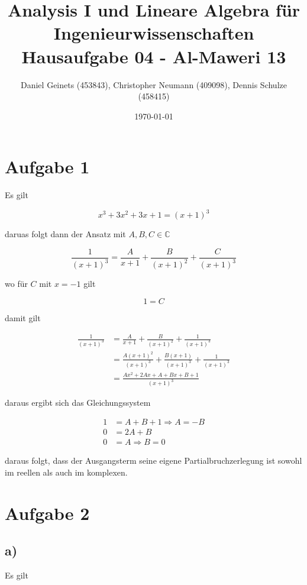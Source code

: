 \documentclass[a4paper, 11pt]{article}
\author{Daniel Geinets (453843), Christopher Neumann (409098), Dennis Schulze (458415)}
\date{\today}
\title{Analysis I und Lineare Algebra für Ingenieurwissenschaften \large  \\ Hausaufgabe 04 - Al-Maweri 13}
\begin{document}
\maketitle
\tableofcontents

\setcounter{secnumdepth}{0}
\newcommand{\tuple}[1]{\left(#1\right)}
\renewcommand{\cfrac}[3]{#1 \tuple{\frac{#2}{#3}}}
\newcommand{\R}{\mathbb{R}}
\newcommand{\Z}{\mathbb{Z}}
\newcommand{\Q}{\mathbb{Q}}
\newcommand{\N}{\mathbb{N}}
\newcommand{\C}{\mathbb{C}}

\pagebreak

\section{Aufgabe 1}
\label{sec:org7eb57be}
Es gilt

$$ x^3 + 3x^2 + 3x + 1 = (x + 1)^3 $$

daruas folgt dann der Ansatz mit \(A, B, C \in \C\)

$$ \frac{1}{(x + 1)^3} = \frac{A}{x+1} + \frac{B}{(x+1)^2} + \frac{C}{(x+1)^3} $$

wo für \(C\) mit \(x = -1\) gilt

$$ 1 = C $$

damit gilt

\begin{align*}
    \frac{1}{(x + 1)^3} &= \frac{A}{x+1} + \frac{B}{(x+1)^2} + \frac{1}{(x+1)^3} \\
    &= \frac{A(x+1)^2}{(x+1)^3} + \frac{B(x+1)}{(x+1)^3} + \frac{1}{(x+1)^3} \\
    &= \frac{Ax^2 + 2Ax + A + Bx + B + 1}{(x+1)^3}
\end{align*}

daraus ergibt sich das Gleichungssystem

\begin{align*}
    1 &= A + B + 1 \Rightarrow A = -B \\
    0 &= 2A + B \\
    0 &= A \Rightarrow B = 0
\end{align*}

daraus folgt, dass der Ausgangsterm seine eigene Partialbruchzerlegung ist sowohl
im reellen als auch im komplexen.

\pagebreak

\section{Aufgabe 2}
\label{sec:orgbcbe81c}
\subsection{a)}
\label{sec:org8a715b9}
Es gilt
\end{document}
